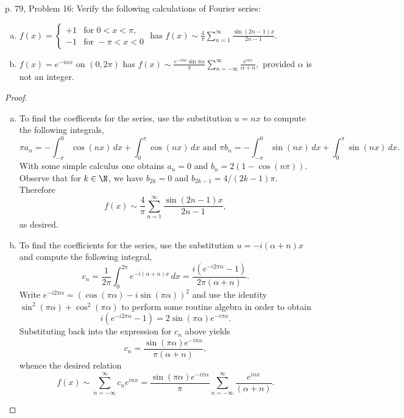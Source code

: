 \documentclass[10pt]{amsart}
\begin{document}
\begin{thm}{p. 79, Problem 16:}
  Verify the following calculations of Fourier series:
  \begin{enumerate}[(a)]
    \item
      $\displaystyle{f(x) = \left\{
      \begin{array}{ll}
        +1 & \text{for } 0 < x < \pi,\\
        -1 & \text{for } -\pi < x < 0
      \end{array}\right. \text{ has } f(x) \sim \frac{4}{\pi} \sum_{n=1}^{\infty} \frac{\sin{(2n-1)x}}{2n-1}}.$
    \item
      $f(x) = e^{-i\alpha x}$ on $(0,2\pi)$ has $f(x) \sim \displaystyle{\frac{e^{-i\pi\alpha}\sin{\pi\alpha}}{\pi} \sum_{n=-\infty}^{\infty} \frac{e^{inx}}{\alpha+n}},$ provided $\alpha$ is not an integer.
  \end{enumerate}
  
  \begin{proof}
    \begin{enumerate}[(a)]
      \item
        To find the coefficents for the series, use the substitution $u=nx$ to compute the following integrals,
        $$\pi a_n = -\int_{-\pi}^{0} \cos(nx)\,dx + \int_{0}^{\pi} \cos(nx)\,dx \text{ and } \pi b_n = -\int_{-\pi}^{0} \sin(nx)\,dx + \int_{0}^{\pi} \sin(nx)\,dx.$$
        With some simple calculus one obtains $a_n = 0$ and $b_n = 2(1 - \cos(n\pi)).$
        Observe that for $k \in \N$, we have $b_{2k} = 0$ and $b_{2k-1} = 4/(2k-1)\pi.$ 
        Therefore $$f(x) \sim \frac{4}{\pi} \sum_{n=1}^{\infty} \frac{\sin{(2n-1)x}}{2n-1},$$ as desired. 
      \item
        To find the coefficients for the series, use the substitution $u = -i(\alpha+n)x$ and compute the following integral,
        $$c_n = \frac{1}{2\pi}\int_{0}^{2\pi}e^{-i(\alpha + n)x}\,dx = \frac{i(e^{-i2\pi\alpha} - 1)}{2\pi(\alpha+n)}.$$
        Write $e^{-i2\pi\alpha} = (\cos(\pi\alpha) - i\sin(\pi\alpha))^2$ and use the identity $\sin^2(\pi\alpha) + \cos^2(\pi\alpha)$ to perform some routine algebra in order to obtain $$i(e^{-i2\pi\alpha} - 1) = 2\sin(\pi\alpha)e^{-i\pi\alpha}.$$
        Substituting back into the expression for $c_n$ above yields $$c_n = \frac{\sin(\pi\alpha)e^{-i\pi\alpha}}{\pi(\alpha + n)},$$
        whence the desired relation  $$f(x) \sim \sum_{n=-\infty}^{\infty}c_ne^{inx} = \frac{\sin(\pi\alpha)e^{-i\pi\alpha}}{\pi} \sum_{n = -\infty}^{\infty} \frac{e^{inx}}{(\alpha + n)}.$$
      \end{enumerate}
  \end{proof}
\end{thm}
\end{document}
